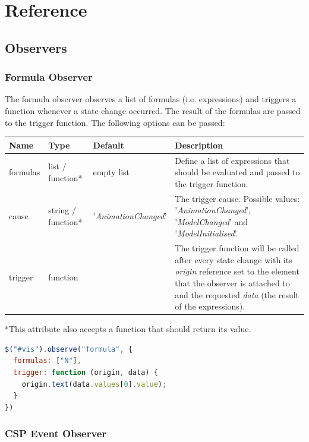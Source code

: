 \section{Reference}
\label{reference_csp}

\subsection{Observers}
\label{observers_csp}

\subsubsection{Formula Observer}

The formula observer observes a list of formulas (i.e. expressions) and triggers a function whenever a state change occurred.
The result of the formulas are passed to the trigger function.
The following options can be passed:

\begin{tabular}{ l l l p{7cm} }
  \textbf{Name} & \textbf{Type} & \textbf{Default} & \textbf{Description} \\
  \hline\noalign{\medskip}
  formulas & list / function* & empty list & Define a list of expressions that should be evaluated and passed to the trigger function.\\
  \hline\noalign{\medskip}
  cause & string / function* & '\textit{AnimationChanged}' & The trigger cause. Possible values: '\textit{AnimationChanged}', '\textit{ModelChanged}' and '\textit{ModelInitialised}'. \\
  \hline\noalign{\medskip}
  trigger & function &  & The trigger function will be called after every state change with its \textit{origin} reference set to the element that the observer is attached to and the requested \textit{data} (the result of the expressions). \\
\end{tabular}

*This attribute also accepts a function that should return its value.

\begin{lstlisting}[language=JavaScript]
$("#vis").observe("formula", {
  formulas: ["N"],
  trigger: function (origin, data) {
    origin.text(data.values[0].value);
  }
})
\end{lstlisting}

\subsubsection{CSP Event Observer}

